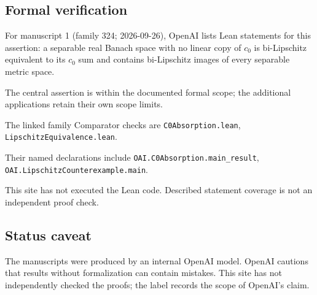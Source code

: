 \documentclass[11pt]{article}
\begin{document}
\subsection{Formal verification}
For manuscript 1 (family 324; 2026-09-26), OpenAI lists Lean statements for this assertion: a separable real Banach space with no linear copy of $c_0$ is bi-Lipschitz equivalent to its $c_0$ sum and contains bi-Lipschitz images of every separable metric space.

The central assertion is within the documented formal scope; the additional applications retain their own scope limits.

The linked family Comparator checks are \texttt{C0Absorption.lean}, \texttt{LipschitzEquivalence.lean}.

Their named declarations include \texttt{OAI.C0Absorption.main\_result}, \texttt{OAI.LipschitzCounterexample.main}.

This site has not executed the Lean code. Described statement coverage is not an independent proof check.

\subsection{Status caveat}
The manuscripts were produced by an internal OpenAI model. OpenAI cautions that results without formalization can contain mistakes. This site has not independently checked the proofs; the label records the scope of OpenAI's claim.
\end{document}
